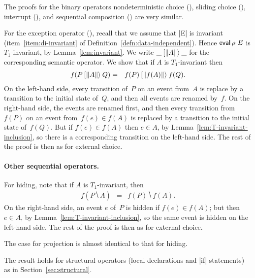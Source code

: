The proofs for the binary operators nondeterministic choice (\CSPM{_ \|~\|
_}), sliding choice (\CSPM{_ [> _}), interrupt (\CSPM{_ /\\ _}), and
sequential composition (\CSPM{_ ; _}) are very similar.

For the exception operator (\CSPM{_ [\| E \|> _}), recall that we assume that
|E| is invariant (item~\ref{item:di-invariant} of
Definition~\ref{defn:data-independent}).  Hence $\mathop{\sf eval} \rho~E$ is
$T_1$-invariant, by Lemma~\ref{lem:invariant}.
%  
We write $\_ \mathbin{[\|A\|\rangle} \_$ for the corresponding semantic operator.  We show
that if $A$ is $T_1$-invariant then
\begin{eqnarray*}
f(P \mathbin{[\|A\|\rangle} Q) & = & f(P) \mathbin{[\|f(A)\|\rangle} f(Q).
\end{eqnarray*}
%
On the left-hand side, every transition of~$P$ on an event from~$A$ is replace
by a transition to the initial state of~$Q$, and then all events are renamed
by~$f$.  On the right-hand side, the events are renamed first, and then every
transition from $f(P)$ on an event from~$f(e) \in f(A)$ is replaced by a
transition to the initial state of~$f(Q)$.  But if $f(e) \in f(A)$ then $e \in
A$, by Lemma~\ref{lem:T-invariant-inclusion}, so there is a corresponding
transition on the left-hand side.  The rest of the proof is then as for
external choice.






\paragraph{Other sequential operators.} 

For hiding, note that if $A$ is $T_1$-invariant, then
\begin{eqnarray*}
f(P \hide A) & = & f(P) \hide f(A).
\end{eqnarray*}
%
On the right-hand side, an event $e$ of~$P$ is hidden if $f(e) \in f(A)$; but
then $e \in A$, by Lemma~\ref{lem:T-invariant-inclusion}, so the same event is
hidden on the left-hand side.  The rest of the proof is then as for external
choice.

The case for projection is almost identical to that for hiding. 

The result holds for structural operators (local declarations and |if|
statements) as in Section~\ref{sec:structural}.

